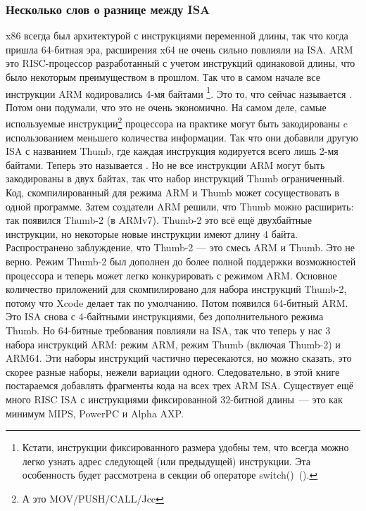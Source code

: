 \subsubsection{Несколько слов о разнице между \ac{ISA}}
x86 всегда был архитектурой с инструкциями переменной длины, так что когда пришла 64-битная эра, расширения x64 не очень сильно повлияли на \ac{ISA}.
ARM это \ac{RISC}-процессор разработанный с учетом инструкций одинаковой длины, что было некоторым преимуществом в прошлом.
Так что в самом начале все инструкции ARM кодировались 4-мя байтами%
\footnote{
Кстати, инструкции фиксированного размера удобны тем, что всегда можно легко узнать адрес 
следующей (или предыдущей) инструкции. Эта особенность будет рассмотрена в секции об операторе switch()~().
}.
Это то, что сейчас называется .
Потом они подумали, что это не очень экономично.
На самом деле, самые используемые инструкции\footnote{А это MOV/PUSH/CALL/Jcc} процессора на практике могут быть закодированы c использованием меньшего количества информации.
Так что они добавили другую \ac{ISA} с названием Thumb, где каждая инструкция кодируется всего лишь 2-мя байтами.
Теперь это называется .
Но не все инструкции ARM могут быть закодированы в двух байтах, так что набор инструкций Thumb ограниченный.
Код, скомпилированный для режима ARM и Thumb может сосуществовать в одной программе.
Затем создатели ARM решили, что Thumb можно расширить: так появился Thumb-2 (в ARMv7).
Thumb-2 это всё ещё двухбайтные инструкции, но некоторые новые инструкции имеют длину 4 байта.
Распространено заблуждение, что Thumb-2 --- это смесь ARM и Thumb. Это не верно. Режим Thumb-2 был дополнен до
более полной поддержки возможностей процессора и теперь может легко конкурировать с режимом ARM.
Основное количество приложений для \idevices скомпилировано для набора инструкций Thumb-2, потому что Xcode
делает так по умолчанию.
Потом появился 64-битный ARM. Это \ac{ISA} снова с 4-байтными инструкциями, без дополнительного режима Thumb.
Но 64-битные требования повлияли на \ac{ISA}, так что теперь у нас 3 набора инструкций ARM: режим ARM, режим Thumb (включая Thumb-2) и ARM64.
Эти наборы инструкций частично пересекаются, но можно сказать, это скорее разные наборы, нежели вариации одного.
Следовательно, в этой книге постараемся добавлять фрагменты кода на всех трех ARM \ac{ISA}.
%
%
%
Существует ещё много \ac{RISC} \ac{ISA} с инструкциями фиксированной 32-битной длины~--- это как минимум MIPS, PowerPC и Alpha AXP.
